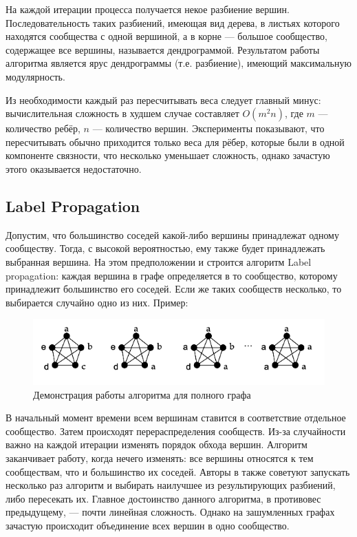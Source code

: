 \documentclass[12pt]{article}
\begin{document}
На каждой итерации процесса получается некое разбиение вершин. Последовательность таких разбиений, имеющая вид дерева, в листьях которого находятся сообщества с одной вершиной, а в корне --- большое сообщество, содержащее все вершины, называется дендрограммой. Результатом работы алгоритма является ярус дендрограммы (т.е. разбиение), имеющий максимальную модулярность. 

Из необходимости каждый раз пересчитывать веса следует главный минус: вычислительная сложность в худшем случае составляет $O(m^2n)$, где $m$ --- количество ребёр, $n$ --- количество вершин. Эксперименты показывают, что пересчитывать обычно приходится только веса для рёбер, которые были в одной компоненте связности, что несколько уменьшает сложность, однако зачастую этого оказывается недостаточно. 


\subsection{Label Propagation}
\label{sec:label_propagation}

Допустим, что большинство соседей какой-либо вершины принадлежат одному сообществу. Тогда, с высокой вероятностью, ему также будет принадлежать выбранная вершина. На этом предположении и строится алгоритм Label propagation: каждая вершина в графе определяется в то сообщество, которому принадлежит большинство его соседей. Если же таких сообществ несколько, то выбирается случайно одно из них. Пример:

\begin{figure}[h]
	\begin{center}
		\includegraphics[scale=0.6]{pics/label_propagation}
	\end{center}
	\caption{Демонстрация работы алгоритма для полного графа}
\end{figure}

В начальный момент времени всем вершинам ставится в соответствие отдельное сообщество. Затем происходят перераспределения сообществ. Из-за случайности важно на каждой итерации изменять порядок обхода вершин. Алгоритм заканчивает работу, когда нечего изменять: все вершины относятся к тем сообществам, что и большинство их соседей. Авторы в \cite{label_propagation} также советуют запускать несколько раз алгоритм и выбирать наилучшее из результирующих разбиений, либо пересекать их. Главное достоинство данного алгоритма, в противовес предыдущему, --- почти линейная сложность. Однако на зашумленных графах зачастую происходит объединение всех вершин в одно сообщество. 
\end{document}
